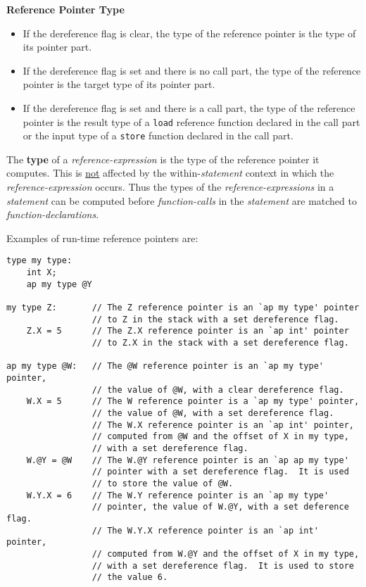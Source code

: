 \documentclass[12pt]{article}
\newcommand{\key}[1]{{\rm \bfseries #1}}
\newenvironment{indpar}[1][0.3in]%
	{\begin{list}{}%
		     {\setlength{\itemsep}{0in}%
		      \setlength{\topsep}{0in}%
		      \setlength{\parsep}{1ex}%
		      \setlength{\labelwidth}{#1}%
		      \setlength{\leftmargin}{#1}%
		      \addtolength{\leftmargin}{\labelsep}}%
	 \item}%
	{\end{list}}
\begin{document}
\centerline{\bf Reference Pointer Type}\label{REFERENCE-POINTER-TYPE}
\begin{itemize}
\item If the dereference flag is clear, the type of the reference pointer
is the type of its pointer part.
\item If the dereference flag is set and there is no call part,
the type of the reference pointer is the target type of its pointer part.
\item If the dereference flag is set and there is a call part,
the type of the reference pointer is the result type of a {\tt load}
reference function declared in the call part or the input type of a {\tt store}
function declared in the call part.
\end{itemize}

The \key{type} of a {\em reference-expression} is the type of the reference
pointer it computes.  This is \underline{not} affected by the
within-{\em statement} context in which the {\em reference-expression}
occurs.  Thus the types of the {\em reference-expressions} in a
{\em statement} can be computed before {\em function-calls} in the
{\em statement} are matched to {\em function-declarations}.

Examples of run-time reference pointers are:
\begin{indpar}\small\begin{verbatim}
type my type:
    int X;
    ap my type @Y

my type Z:       // The Z reference pointer is an `ap my type' pointer
                 // to Z in the stack with a set dereference flag.
    Z.X = 5      // The Z.X reference pointer is an `ap int' pointer
                 // to Z.X in the stack with a set dereference flag.

ap my type @W:   // The @W reference pointer is an `ap my type' pointer,
                 // the value of @W, with a clear dereference flag.
    W.X = 5      // The W reference pointer is a `ap my type' pointer,
                 // the value of @W, with a set dereference flag.
                 // The W.X reference pointer is an `ap int' pointer,
                 // computed from @W and the offset of X in my type,
                 // with a set dereference flag.
    W.@Y = @W    // The W.@Y reference pointer is an `ap ap my type'
                 // pointer with a set dereference flag.  It is used
                 // to store the value of @W.
    W.Y.X = 6    // The W.Y reference pointer is an `ap my type'
                 // pointer, the value of W.@Y, with a set deference flag.
                 // The W.Y.X reference pointer is an `ap int' pointer,
                 // computed from W.@Y and the offset of X in my type,
                 // with a set dereference flag.  It is used to store
                 // the value 6.
\end{verbatim}\end{indpar}
\end{document}
